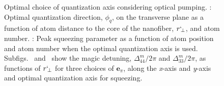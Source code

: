 \documentclass[preprint,aps,pra,onecolumn]{revtex4-1} %
\newcommand{\qaxis}{\mathbf{e}_\pi}
\begin{document}
\begin{figure}
\begin{minipage}{.49\linewidth}
\end{minipage}
\begin{minipage}{.49\linewidth}
\centering
{}
\end{minipage}
\caption{ Optimal choice of quantization axis considering optical pumping. \protect{}: Optimal quantization direction, $ \phi_q $, on the transverse plane as a function of atom distance to the core of the nanofiber, $ r`\!_\perp $, and atom number.
\protect{}: Peak squeezing parameter as a function of atom position and atom number when the optimal quantization axis is used. Subfigs.~\protect{} and~\protect{} show the magic detuning, $\Delta_{44}^m/2\pi$ and $ \Delta_{33}^m/2\pi $, as functions of $ r`\!_\perp $ for three choices of $\qaxis$, along the \emph{x}-axis and \emph{y}-axis and optimal quantization axis for squeezing.
} \label{Fig::D1_magicfreqs}
\end{figure}
\end{document}
